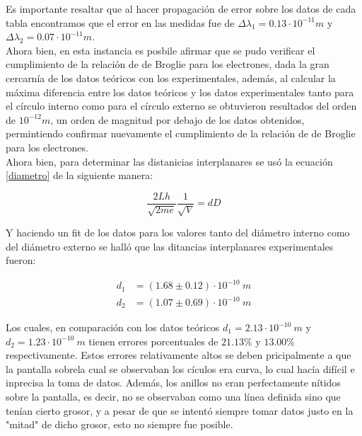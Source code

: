 \documentclass[prb,aps,twocolumn,preprintnumbers,amsmath,amssymb]{revtex4}
\begin{document}
Es importante resaltar que al hacer propagación de error \footnotemark[3] sobre los datos de cada tabla encontramos que el error en las medidas fue de $\Delta \lambda_{1} = 0.13  \cdot 10^{-11} m$ y $\Delta \lambda_{2} = 0.07 \cdot 10^{-11} m$.\\

Ahora bien, en esta instancia es posbile afirmar que se pudo verificar el cumplimiento de la relación de de Broglie para los electrones, dada la gran cercarnía de los datos teóricos con los experimentales, además, al calcular la máxima diferencia entre los datos teóricos y los datos experimentales tanto para el círculo interno como para el círculo externo se obtuvieron resultados del orden de $10^{-12} m$, un orden de magnitud por debajo de los datos obtenidos, permintiendo confirmar nuevamente el cumplimiento de la relación de de Broglie para los electrones.\\

Ahora bien, para determinar las distanicias interplanares se usó la ecuación \eqref{diametro} de la siguiente manera:

\begin{equation}
\label{diametro2}
\frac{2Lh}{\sqrt{2me}} \frac{1}{\sqrt{V}} = dD
\end{equation}

Y haciendo un fit de los datos para los valores tanto del diámetro interno como del diámetro externo se halló que las ditancias interplanares experimentales fueron:

\begin{equation}
\label{lissa}
\begin{split}
d_{1} &= (1.68 \pm 0.12 )\cdot 10^{-10}\ m\\
d_{2} &= (1.07 \pm 0.69 )\cdot 10^{-10}\ m
\end{split}
\end{equation}

Los cuales, en comparación con los datos teóricos $d_{1} = 2.13 \cdot 10^{-10}\ m$ y $d_{2} = 1.23 \cdot 10^{-10}\ m$ tienen errores porcentuales de $21.13\%$ y $13.00\%$ respectivamente. Estos errores relativamente altos se deben pricipalmente a que la pantalla sobrela cual se observaban los cículos era curva, lo cual hacía difícil e inprecisa la toma de datos. Además, los anillos no eran perfectamente nítidos sobre la pantalla, es decir, no se observaban como una línea definida sino que tenían cierto grosor, y a pesar de que se intentó siempre tomar datos justo en la "mitad" de dicho grosor, esto no siempre fue posible.\\
\end{document}
